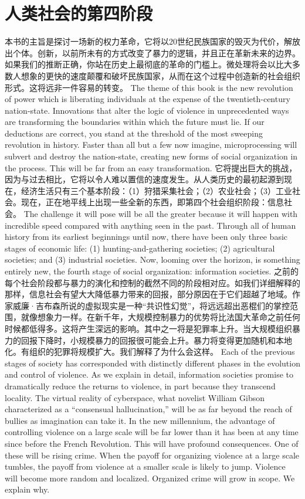 \section{人类社会的第四阶段}
\begin{paracol}{2}[]
本书的主旨是探讨一场新的权力革命，它将以20世纪民族国家的毁灭为代价，解放出个体。创新，以前所未有的方式改变了暴力的逻辑，并且正在革新未来的边界。如果我们的推断正确，你站在历史上最彻底的革命的门槛上。微处理将会以比大多数人想象的更快的速度颠覆和破坏民族国家，从而在这个过程中创造新的社会组织形式。这将远非一件容易的转变。
\switchcolumn
The theme of this book is the new revolution of power which is liberating individuals at the expense of the twentieth-century nation-state. Innovations that alter the logic of violence in unprecedented ways are transforming the boundaries within which the future must lie. If our deductions are correct, you stand at the threshold of the most sweeping revolution in history. Faster than all but a few now imagine, microprocessing will subvert and destroy the nation-state, creating new forms of social organization in the process. This will be far from an easy transformation.
\switchcolumn*
它将提出巨大的挑战，因为与过去相比，它将以令人难以置信的速度发生。从人类历史的最初起源到现在，经济生活只有三个基本阶段：（1）狩猎采集社会；（2）农业社会；（3）工业社会。现在，正在地平线上出现一些全新的东西，即第四个社会组织阶段：信息社会。
\switchcolumn
The challenge it will pose will be all the greater because it will happen with incredible speed compared with anything seen in the past. Through all of human history from its earliest beginnings until now, there have been only three basic stages of economic life: (1) hunting-and-gathering societies; (2) agricultural societies; and (3) industrial societies. Now, looming over the horizon, is something entirely new, the fourth stage of social organization: information societies.
\switchcolumn*
之前的每个社会阶段都与暴力的演化和控制的截然不同的阶段相对应。如我们详细解释的那样，信息社会有望大大降低暴力带来的回报，部分原因在于它们超越了地域。作家威廉·吉布森所说的虚拟现实是一种“共识性幻觉”，将远远超出恶棍们的掌控范围，就像想象力一样。在新千年，大规模控制暴力的优势将比法国大革命之前任何时候都低得多。这将产生深远的影响。其中之一将是犯罪率上升。当大规模组织暴力的回报下降时，小规模暴力的回报很可能会上升。暴力将变得更加随机和本地化。有组织的犯罪将规模扩大。我们解释了为什么会这样。
\switchcolumn
Each of the previous stages of society has corresponded with distinctly different phases in the evolution and control of violence. As we explain in detail, information societies promise to dramatically reduce the returns to violence, in part because they transcend locality. The virtual reality of cyberspace, what novelist William Gibson characterized as a “consensual hallucination,” will be as far beyond the reach of bullies as imagination can take it. In the new millennium, the advantage of controlling violence on a large scale will be far lower than it has been at any time since before the French Revolution. This will have profound consequences. One of these will be rising crime. When the payoff for organizing violence at a large scale tumbles, the payoff from violence at a smaller scale is likely to jump. Violence will become more random and localized. Organized crime will grow in scope. We explain why.

\end{paracol}
